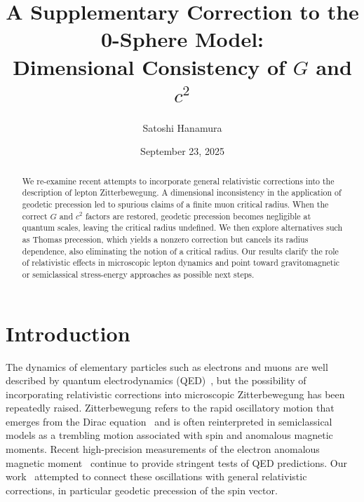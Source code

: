 \documentclass[%
 reprint,
 amsmath,amssymb,
 aps,
]{revtex4-1}
\numberwithin{equation}{section}%
\begin{document}


\title{A Supplementary Correction to the 0-Sphere Model:\\ Dimensional Consistency of $G$ and $c^2$}
\author{Satoshi Hanamura}
\date{September 23, 2025}



\begin{abstract}
We re-examine recent attempts to incorporate general relativistic corrections into the description of lepton Zitterbewegung. 
A dimensional inconsistency in the application of geodetic precession led to spurious claims of a finite muon critical radius. 
When the correct $G$ and $c^2$ factors are restored, geodetic precession becomes negligible at quantum scales, 
leaving the critical radius undefined. We then explore alternatives such as Thomas precession, which yields a nonzero correction 
but cancels its radius dependence, also eliminating the notion of a critical radius. 
Our results clarify the role of relativistic effects in microscopic lepton dynamics and point toward gravitomagnetic 
or semiclassical stress-energy approaches as possible next steps. 
\end{abstract}

\maketitle


\section{Introduction}

The dynamics of elementary particles such as electrons and muons are well described by quantum electrodynamics (QED)~\cite{schwinger1948}, but the possibility of incorporating relativistic corrections into microscopic Zitterbewegung has been repeatedly raised. 
Zitterbewegung refers to the rapid oscillatory motion that emerges from the Dirac equation~\cite{dirac1928,zitterbewegung1930} and is often reinterpreted in semiclassical models as a trembling motion associated with spin and anomalous magnetic moments. Recent high-precision measurements of the electron anomalous magnetic moment~\cite{fan2023} continue to provide stringent tests of QED predictions. Our work~\cite{zenodo.16905633} attempted to connect these oscillations with general relativistic corrections, in particular geodetic precession of the spin vector.
\end{document}
